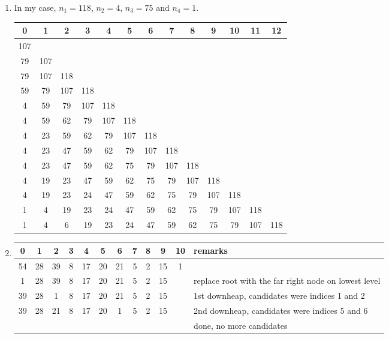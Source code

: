 \documentclass{article}
\begin{document}
\begin{enumerate}[label=(\alph*)]
    \item In my case, $n_1 = 118$, $n_2 = 4$, $n_3 = 75$ and $n_4 = 1$.
    \begin{center}
        \begin{tabular}{c c c c c c c c c c c c c}\toprule
            0 & 1 & 2 & 3 & 4 & 5 & 6 & 7 & 8 & 9 & 10 & 11 & 12 \\\midrule
            107 \\
            79 & 107 \\
            79 & 107 & 118 \\
            59 & 79 & 107 & 118 \\
            4 & 59 & 79 & 107 & 118 \\
            4 & 59 & 62 & 79 & 107 & 118 \\
            4 & 23 & 59 & 62 & 79 & 107 & 118 \\
            4 & 23 & 47 & 59 & 62 & 79 & 107 & 118 \\
            4 & 23 & 47 & 59 & 62 & 75 & 79 & 107 & 118 \\
            4 & 19 & 23 & 47 & 59 & 62 & 75 & 79 & 107 & 118 \\
            4 & 19 & 23 & 24 & 47 & 59 & 62 & 75 & 79 & 107 & 118 \\
            1 & 4 & 19 & 23 & 24 & 47 & 59 & 62 & 75 & 79 & 107 & 118 \\
            1 & 4 & 6 & 19 & 23 & 24 & 47 & 59 & 62 & 75 & 79 & 107 & 118 \\\bottomrule
        \end{tabular}
    \end{center}

    \item \phantom{} \begin{center}
        \begin{tabular}{c c c c c c c c c c c l}\toprule
            0 & 1 & 2 & 3 & 4 & 5 & 6 & 7 & 8 & 9 & 10 & remarks \\\midrule
            54 & 28 & 39 & 8 & 17 & 20 & 21 & 5 & 2 & 15 & 1 & \\
            1 & 28 & 39 & 8 & 17 & 20 & 21 & 5 & 2 & 15 & & replace root with the far right node on lowest level  \\
            39 & 28 & 1 & 8 & 17 & 20 & 21 & 5 & 2 & 15 & & 1st downheap, candidates were indices 1 and 2 \\
            39 & 28 & 21 & 8 & 17 & 20 & 1 & 5 & 2 & 15 & & 2nd downheap, candidates were indices 5 and 6 \\
            &&&&&&&&&&& done, no more candidates
        \end{tabular}
    \end{center}
\end{enumerate}
\end{document}
